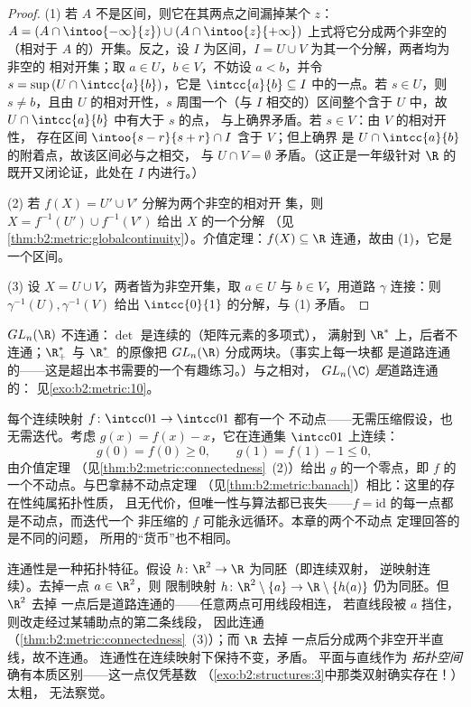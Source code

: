 \begin{proof}
(1) 若 $A$ 不是区间，则它在其两点之间漏掉某个 $z$：
$A = (A \cap \intoo{-\infty}{z}) \cup (A \cap \intoo{z}{+\infty})$
上式将它分成两个非空的（相对于 $A$ 的）开集。反之，设
$I$ 为区间，$I = U \cup V$ 为其一个分解，两者均为非空的
相对开集；取 $a \in U$，$b \in V$，不妨设 $a < b$，并令
$s = \sup\,(U \cap \intcc{a}{b})$，它是 $\intcc{a}{b}
\subseteq I$ 中的一点。若 $s \in U$，则 $s \neq b$，且由
$U$ 的相对开性，$s$ 周围一个（与 $I$ 相交的）区间整个含于
$U$ 中，故 $U \cap \intcc{a}{b}$ 中有大于 $s$ 的点，
与上确界矛盾。若 $s \in V$：由 $V$ 的相对开性，
存在区间 $\intoo{s - r}{s + r} \cap I$ 含于 $V$；但上确界
是 $U \cap \intcc{a}{b}$ 的附着点，故该区间必与之相交，
与 $U \cap V = \emptyset$ 矛盾。（这正是一年级针对
$\R$ 的既开又闭论证，此处在 $I$ 内进行。）

(2) 若 $f(X) = U' \cup V'$ 分解为两个非空的相对开
集，则 $X = f^{-1}(U') \cup f^{-1}(V')$ 给出 $X$ 的一个分解
（见\cref{thm:b2:metric:globalcontinuity}）。介值定理：$f(X) \subseteq \R$
连通，故由 (1)，它是一个区间。

(3) 设 $X = U \cup V$，两者皆为非空开集，取 $a \in U$
与 $b \in V$，用道路 $\gamma$ 连接：则 $\gamma^{-1}(U),
\gamma^{-1}(V)$ 给出 $\intcc{0}{1}$ 的分解，与 (1) 矛盾。
\end{proof}

\begin{example}\label{ex:b2:metric:glnr}
$GL_n(\R)$ 不连通：$\det$ 是连续的（矩阵元素的多项式），
满射到 $\R^*$ 上，后者不连通；$\R_+^*$ 与
$\R_-^*$ 的原像把 $GL_n(\R)$ 分成两块。（事实上每一块都
是道路连通的——这是超出本书需要的一个有趣练习。）与之相对，
$GL_n(\C)$ \emph{是}道路连通的：
见\cref{exo:b2:metric:10}。
\end{example}

\begin{example}[仅由连通性得到的不动点]\label{ex:b2:metric:ivtfixed}
每个连续映射 $f \colon \intcc01 \to \intcc01$ 都有一个
不动点——无需压缩假设，也无需迭代。考虑
$g(x) = f(x) - x$，它在连通集 $\intcc01$ 上连续：
\[
g(0) = f(0) \geq 0,
\qquad
g(1) = f(1) - 1 \leq 0 ,
\]
由介值定理
（见\cref{thm:b2:metric:connectedness}~(2)）给出
$g$ 的一个零点，即 $f$ 的一个不动点。与巴拿赫不动点定理
（见\cref{thm:b2:metric:banach}）相比：这里的存在性纯属拓扑性质，
且无代价，但唯一性与算法都已丧失——$f =
\mathrm{id}$ 的每一点都是不动点，而迭代一个
非压缩的 $f$ 可能永远循环。本章的两个不动点
定理回答的是不同的问题，
所用的“货币”也不相同。
\end{example}

\begin{example}[$\R$ 与 $\R^2$ 不同胚]\label{ex:b2:metric:rnotr2}
连通性是一种拓扑特征。假设 $h \colon
\R^2 \to \R$ 为同胚（即连续双射，
逆映射连续）。去掉一点 $a \in \R^2$，则
限制映射 $h \colon \R^2\setminus\{a\} \to
\R\setminus\{h(a)\}$ 仍为同胚。但 $\R^2$ 去掉
一点后是道路连通的——任意两点可用线段相连，
若直线段被 $a$ 挡住，则改走经过某辅助点的第二条线段，
因此连通
（\cref{thm:b2:metric:connectedness}~(3)）；而 $\R$ 去掉
一点后分成两个非空开半直线，故不连通。
连通性在连续映射下保持不变，矛盾。
平面与直线作为\emph{
拓扑空间}确有本质区别——这一点仅凭基数
（\cref{exo:b2:structures:3}中那类双射确实存在！）太粗，
无法察觉。
\end{example}

